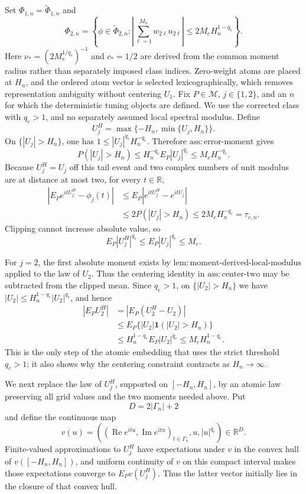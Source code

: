 Set \(\Phi_{1,n}=\widetilde\Phi_{1,n}\) and
\[
 \Phi_{2,n}
 =\left\{\phi\in\widetilde\Phi_{2,n}:
 \left|\sum_{\ell=1}^{M_n}w_{2\ell}u_{2\ell}\right|
 \le2M_eH_n^{1-q_e}\right\}.
\]
Here \(\nu_*=(2M_e^{1/q_e})^{-1}\) and \(c_*=1/2\) are derived from
the common moment radius rather than separately imposed class indices.
Zero-weight atoms are placed at \(H_n\), and the ordered atom vector is
selected lexicographically, which removes representation ambiguity without
centering \(U_1\).
Fix \(P\in\mathcal M\), \(j\in\{1,2\}\), and an \(n\) for which the
deterministic tuning objects are defined.  We use the corrected class with
\(q_e>1\), and no separately assumed local spectral modulus.  Define
\[
 U_j^H=\max\{-H_n,\min\{U_j,H_n\}\}.
\]
On \(\{|U_j|>H_n\}\), one has
\(1\le |U_j|^{q_e}H_n^{-q_e}\).  Therefore
\(\mathrm{ass{:}error\text{-}moment}\) gives
\[
 P(|U_j|>H_n)
 \le H_n^{-q_e}E_P|U_j|^{q_e}
 \le M_eH_n^{-q_e}.                                                \tag{1}
\]
Because \(U_j^H=U_j\) off this tail event and two complex numbers of unit
modulus are at distance at most two, for every \(t\in\mathbb R\),
\[
 \begin{aligned}
 \left|E_Pe^{itU_j^H}-\phi_j(t)\right|
 &\le E_P\left|e^{itU_j^H}-e^{itU_j}\right|\\
 &\le2P(|U_j|>H_n)
 \le2M_eH_n^{-q_e}=\tau_{e,n}.                                    \tag{2}
 \end{aligned}
\]
Clipping cannot increase absolute value, so
\[
 E_P|U_j^H|^{q_e}\le E_P|U_j|^{q_e}\le M_e.                       \tag{3}
\]

For \(j=2\), the first absolute moment exists by
\(\mathrm{lem{:}moment\text{-}derived\text{-}local\text{-}modulus}\)
applied to the law of \(U_2\).  Thus the centering identity in
\(\mathrm{ass{:}center\text{-}two}\) may be subtracted from the clipped
mean.  Since \(q_e>1\), on \(\{|U_2|>H_n\}\) we have
\(|U_2|\le H_n^{1-q_e}|U_2|^{q_e}\), and hence
\[
 \begin{aligned}
 |E_PU_2^H|
 &=|E_P(U_2^H-U_2)|\\
 &\le E_P\{|U_2|\mathbf 1(|U_2|>H_n)\}\\
 &\le H_n^{1-q_e}E_P|U_2|^{q_e}
 \le M_eH_n^{1-q_e}.                                              \tag{4}
 \end{aligned}
\]
This is the only step of the atomic embedding that uses the strict threshold
\(q_e>1\); it also shows why the centering constraint contracts as
\(H_n\to\infty\).

We next replace the law of \(U_j^H\), supported on \([-H_n,H_n]\), by an
atomic law preserving all grid values and the two moments needed above.  Put
\[
 D=2|\Gamma_n|+2
\]
and define the continuous map
\[
 v(u)=\left(
   (\operatorname{Re}e^{itu},\operatorname{Im}e^{itu})_{t\in\Gamma_n},
   u,|u|^{q_e}
 \right)\in\mathbb R^D.                                           \tag{5}
\]
Finite-valued approximations to \(U_j^H\) have expectations under \(v\) in
the convex hull of \(v([-H_n,H_n])\), and uniform continuity of \(v\) on
this compact interval makes those expectations converge to
\(E_Pv(U_j^H)\).  Thus the latter vector initially lies in the closure of
that convex hull.

